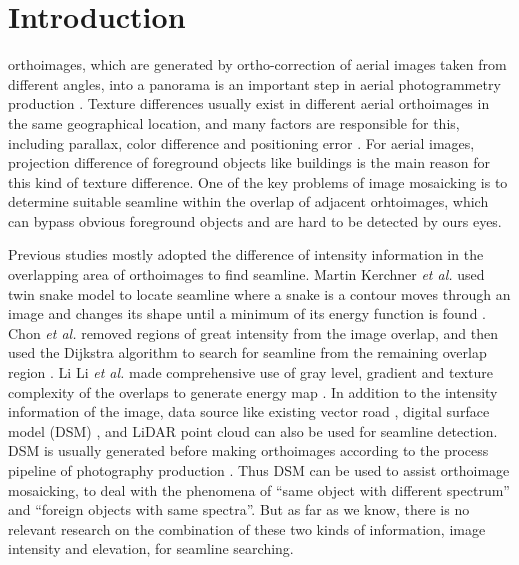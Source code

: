 \documentclass[journal]{IEEEtran}
\begin{document}
\IEEEpeerreviewmaketitle

\section{Introduction}
 orthoimages, which are generated by ortho-correction of aerial images taken from different angles, into a panorama is an important step in aerial photogrammetry production \cite{Chon2010,Pan2014a,Mills2013}. Texture differences usually exist in different aerial orthoimages in the same geographical location, and many factors are responsible for this, including parallax, color difference and positioning error \cite{Li2015,Yu2012,Zhang2014}. For aerial images, projection difference of foreground objects like buildings is the main reason for this kind of texture difference. One of the key problems of image mosaicking is to determine suitable seamline within the overlap of adjacent orhtoimages, which can bypass obvious foreground objects and are hard to be detected by ours eyes.

Previous studies mostly adopted the difference of intensity information in the overlapping area of orthoimages to find seamline. Martin Kerchner \textit{et al.} used twin snake model to locate seamline where a snake is a contour moves through an image and changes its shape until a minimum of its energy function is found \cite{Kerschner2001}. Chon \textit{et al.} removed regions of great intensity from the image overlap, and then used the Dijkstra algorithm to search for seamline from the remaining overlap region \cite{Chon2010}. Li Li \textit{et al.} made comprehensive use of gray level, gradient and texture complexity of the overlaps to generate energy map \cite{Li2016}. In addition to the intensity information of the image, data source like existing vector road \cite{Wan2013}, digital surface model (DSM) \cite{Chen2014}, and LiDAR point cloud \cite{Hong2011Intelligent,Pang2016SGM} can also be used for seamline detection. DSM is usually generated before making orthoimages according to the process pipeline of photography production \cite{Mills2013}. Thus DSM can be used to assist orthoimage mosaicking, to deal with the phenomena of ``same object with different spectrum'' and ``foreign objects with same spectra''. But as far as we know, there is no relevant research on the combination of these two kinds of information, image intensity and elevation, for seamline searching. 
\end{document}
